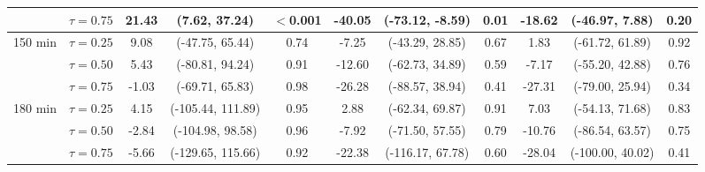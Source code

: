 \begin{table}[ht]
{\begin{tabular}{llccccccccc}
 & $\tau=0.75$ & \textbf{21.43} & \textbf{(7.62, 37.24)} & \textbf{$<$0.001} & \textbf{-40.05} & \textbf{(-73.12, -8.59)} & \textbf{0.01} & -18.62 & (-46.97, 7.88) & 0.20 \\
\midrule
\multirow{3}{*}{150 min} & $\tau=0.25$ & 9.08 & (-47.75, 65.44) & 0.74 & -7.25 & (-43.29, 28.85) & 0.67 & 1.83 & (-61.72, 61.89) & 0.92 \\
 & $\tau=0.50$ & 5.43 & (-80.81, 94.24) & 0.91 & -12.60 & (-62.73, 34.89) & 0.59 & -7.17 & (-55.20, 42.88) & 0.76 \\
 & $\tau=0.75$ & -1.03 & (-69.71, 65.83) & 0.98 & -26.28 & (-88.57, 38.94) & 0.41 & -27.31 & (-79.00, 25.94) & 0.34 \\
\midrule
\multirow{3}{*}{180 min} & $\tau=0.25$ & 4.15 & (-105.44, 111.89) & 0.95 & 2.88 & (-62.34, 69.87) & 0.91 & 7.03 & (-54.13, 71.68) & 0.83 \\
 & $\tau=0.50$ & -2.84 & (-104.98, 98.58) & 0.96 & -7.92 & (-71.50, 57.55) & 0.79 & -10.76 & (-86.54, 63.57) & 0.75 \\
 & $\tau=0.75$ & -5.66 & (-129.65, 115.66) & 0.92 & -22.38 & (-116.17, 67.78) & 0.60 & -28.04 & (-100.00, 40.02) & 0.41 \\
\bottomrule
\end{tabular}%
}
\end{table}

